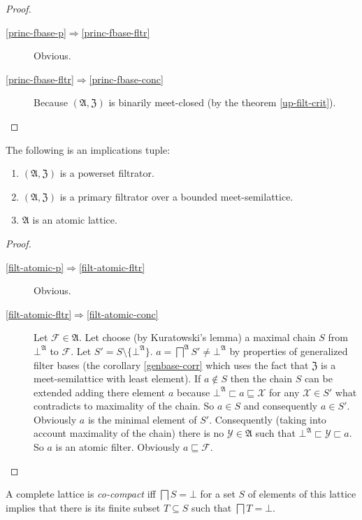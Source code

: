 \begin{proof}
~
\begin{description}
\item [{\ref{princ-fbase-p}$\Rightarrow$\ref{princ-fbase-fltr}}] Obvious.
\item [{\ref{princ-fbase-fltr}$\Rightarrow$\ref{princ-fbase-conc}}] Because
$(\mathfrak{A},\mathfrak{Z})$ is binarily meet-closed (by the theorem
\ref{up-filt-crit}).
\end{description}
\end{proof}
\begin{thm}
\label{filt-atomic}The following is an implications tuple:
\begin{enumerate}
\item \label{filt-atomic-p}$(\mathfrak{A},\mathfrak{Z})$ is a powerset
filtrator.
\item \label{filt-atomic-fltr}$(\mathfrak{A},\mathfrak{Z})$ is a primary
filtrator over a bounded meet-semilattice.
\item \label{filt-atomic-conc}$\mathfrak{A}$ is an atomic lattice.
\end{enumerate}
\end{thm}
\begin{proof}
~
\begin{description}
\item [{\ref{filt-atomic-p}$\Rightarrow$\ref{filt-atomic-fltr}}] Obvious.
\item [{\ref{filt-atomic-fltr}$\Rightarrow$\ref{filt-atomic-conc}}] Let
$\mathcal{F}\in\mathfrak{A}$. Let choose (by Kuratowski's lemma)
a maximal chain $S$ from $\bot^{\mathfrak{A}}$ to $\mathcal{F}$.
Let $S'=S\setminus\{\bot^{\mathfrak{A}}\}$. $a=\bigsqcap^{\mathfrak{A}}S'\ne\bot^{\mathfrak{A}}$
by properties of generalized filter bases (the corollary \ref{genbase-corr}
which uses the fact that $\mathfrak{Z}$ is a meet-semilattice with
least element). If $a\notin S$ then the chain $S$ can be extended
adding there element $a$ because $\bot^{\mathfrak{A}}\sqsubset a\sqsubseteq\mathcal{X}$
for any $\mathcal{X}\in S'$ what contradicts to maximality of the
chain. So $a\in S$ and consequently $a\in S'$. Obviously $a$ is
the minimal element of $S'$. Consequently (taking into account maximality
of the chain) there is no $\mathcal{Y}\in\mathfrak{A}$ such that
$\bot^{\mathfrak{A}}\sqsubset\mathcal{Y}\sqsubset a$. So $a$ is
an atomic filter. Obviously $a\sqsubseteq\mathcal{F}$.
\end{description}
\end{proof}
\begin{defn}
A complete lattice is \emph{co-compact} iff $\bigsqcap S=\bot$ for
a set $S$ of elements of this lattice implies that there is its finite
subset $T\subseteq S$ such that $\bigsqcap T=\bot$.\end{defn}

